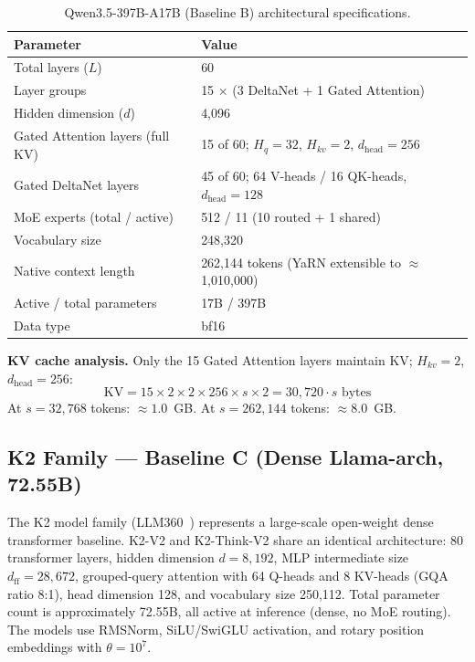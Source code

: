 \documentclass[11pt]{article}
\begin{document}
\begin{table}[ht]
\centering
\caption{Qwen3.5-397B-A17B (Baseline B) architectural specifications.}
\label{tab:b_specs}
\begin{tabular}{ll}
\toprule
\textbf{Parameter} & \textbf{Value} \\
\midrule
Total layers ($L$) & 60 \\
Layer groups & 15 $\times$ (3 DeltaNet + 1 Gated Attention) \\
Hidden dimension ($d$) & 4,096 \\
Gated Attention layers (full KV) & 15 of 60; $H_q = 32$, $H_{kv} = 2$, $d_{\text{head}} = 256$ \\
Gated DeltaNet layers & 45 of 60; 64 V-heads / 16 QK-heads, $d_{\text{head}} = 128$ \\
MoE experts (total / active) & 512 / 11 (10 routed + 1 shared) \\
Vocabulary size & 248,320 \\
Native context length & 262,144 tokens (YaRN extensible to $\approx$1,010,000) \\
Active / total parameters & 17B / 397B \\
Data type & bf16 \\
\bottomrule
\end{tabular}
\end{table}

\textbf{KV cache analysis.}
Only the 15 Gated Attention layers maintain KV; $H_{kv} = 2$, $d_{\text{head}} = 256$:
\[
\text{KV} = 15 \times 2 \times 2 \times 256 \times s \times 2 = 30{,}720 \cdot s \text{ bytes}
\]
At $s = 32{,}768$ tokens: $\approx 1.0$~GB.
At $s = 262{,}144$ tokens: $\approx 8.0$~GB.

\subsection{K2 Family --- Baseline C (Dense Llama-arch, 72.55B)}
\label{subsec:baselineC}

The K2 model family (LLM360~\cite{LLM360K2V2_2025}) represents a large-scale open-weight dense transformer baseline. K2-V2 and K2-Think-V2 share an identical architecture: 80 transformer layers, hidden dimension $d = 8{,}192$, MLP intermediate size $d_{\mathrm{ff}} = 28{,}672$, grouped-query attention with 64 Q-heads and 8 KV-heads (GQA ratio 8:1), head dimension 128, and vocabulary size 250,112. Total parameter count is approximately 72.55B, all active at inference (dense, no MoE routing). The models use RMSNorm, SiLU/SwiGLU activation, and rotary position embeddings with $\theta = 10^7$.
\end{document}
